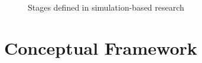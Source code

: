\documentclass[11pt,oneside,a4paper,openright]{report}
\begin{document}
\begin{figure}[!htb]
\centering
\setlength\fboxsep{0pt}
\setlength\fboxrule{0.5pt}
\caption{Stages defined in simulation-based research \cite{RussellNorvig}}
\label{fig:SimStages}
\end{figure}







\section{Conceptual Framework}
\end{document}
